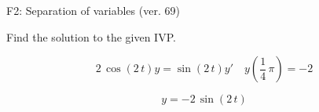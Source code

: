 \begin{exercise}
  \begin{exerciseTitle}F2: Separation of variables (ver. 69)\end{exerciseTitle}
  \begin{exerciseStatement}
    
Find the solution to the given IVP.

    
\[2 \, \cos\left(2 \, t\right) y= \sin\left(2 \, t\right) y'\hspace{1em} y\left( \frac{1}{4} \, \pi \right)= -2\]

  \end{exerciseStatement}
  \begin{exerciseAnswer}
    
\[y= -2 \, \sin\left(2 \, t\right)\]

  \end{exerciseAnswer}
\end{exercise}